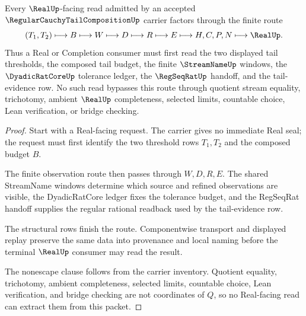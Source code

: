 \begin{theorem}
\label{thm:regular-cauchy-tail-composition-real-route}
Every $\RealUp$-facing read admitted by an accepted $\RegularCauchyTailCompositionUp$ carrier factors through the finite route
$$
(T_1,T_2) \longmapsto B \longmapsto W \longmapsto D \longmapsto R \longmapsto E \longmapsto H,C,P,N \longmapsto \RealUp .
$$
Thus a Real or Completion consumer must first read the two displayed tail thresholds, the composed tail budget, the finite $\StreamNameUp$ windows, the $\DyadicRatCoreUp$ tolerance ledger, the $\RegSeqRatUp$ handoff, and the tail-evidence row. No such read bypasses this route through quotient stream equality, trichotomy, ambient $\RealUp$ completeness, selected limits, countable choice, Lean verification, or bridge checking.
\end{theorem}
\begin{proof}
Start with a Real-facing request. The carrier gives no immediate Real seal; the request must first identify the two threshold rows $T_1,T_2$ and the composed budget $B$.

The finite observation route then passes through $W,D,R,E$. The shared StreamName windows determine which source and refined observations are visible, the DyadicRatCore ledger fixes the tolerance budget, and the RegSeqRat handoff supplies the regular rational readback used by the tail-evidence row.

The structural rows finish the route. Componentwise transport and displayed replay preserve the same data into provenance and local naming before the terminal $\RealUp$ consumer may read the result.

The nonescape clause follows from the carrier inventory. Quotient equality, trichotomy, ambient completeness, selected limits, countable choice, Lean verification, and bridge checking are not coordinates of $Q$, so no Real-facing read can extract them from this packet.
\end{proof}


